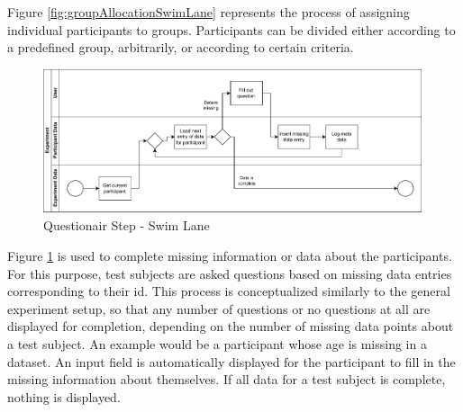 
\newpage

Figure \ref{fig:groupAllocationSwimLane} represents the process of assigning individual participants to groups. Participants can be divided either according to a predefined group, arbitrarily, or according to certain criteria.


\begin{figure}[htbp]
    \centering
    \includegraphics[width=0.99\textwidth, keepaspectratio]{content/05_design_and_dev_artefacts/QuestionairSwimLane.drawio.pdf}
    \caption{Questionair Step - Swim Lane}    
    \label{fig:questionairSwimLane}
\end{figure}


Figure \ref{fig:questionairSwimLane} is used to complete missing information or data about the participants. For this purpose, test subjects are asked questions based on missing data entries corresponding to their \ac{id}. This process is conceptualized similarly to the general experiment setup, so that any number of questions or no questions at all are displayed for completion, depending on the number of missing data points about a test subject. An example would be a participant whose age is missing in a dataset. An input field is automatically displayed for the participant to fill in the missing information about themselves. If all data for a test subject is complete, nothing is displayed.


